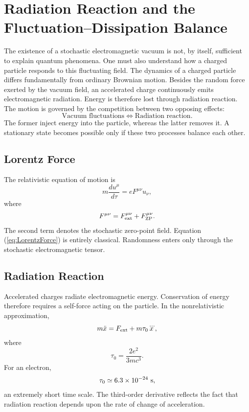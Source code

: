 \section{Radiation Reaction and the Fluctuation--Dissipation Balance}
\label{sec:RadiationReaction}
The existence of a stochastic electromagnetic vacuum is not, by itself,
sufficient to explain quantum phenomena. One must also understand how a
charged particle responds to this fluctuating field.
The dynamics of a charged particle differs fundamentally from ordinary
Brownian motion. Besides the random force exerted by the vacuum field,
an accelerated charge continuously emits electromagnetic radiation.
Energy is therefore lost through radiation reaction.
The motion is governed by the competition between two opposing effects:
\[\boxed{\text{Vacuum fluctuations}\Longleftrightarrow\text{Radiation reaction}.}\]
The former inject energy into the particle, whereas the latter removes
it. A stationary state becomes possible only if these two processes
balance each other.
\subsection{Lorentz Force}
The relativistic equation of motion is
\begin{equation}
m\frac{du^\mu}{d\tau}=eF^{\mu\nu}u_\nu ,
\label{eq:LorentzForce}
\end{equation}
where
\[F^{\mu\nu}=F^{\mu\nu}_{\rm ext}+F^{\mu\nu}_{\rm ZP}.\]
The second term denotes the stochastic zero-point field.
Equation (\ref{eq:LorentzForce}) is entirely classical.
Randomness enters only through the stochastic electromagnetic tensor.
\subsection{Radiation Reaction}
Accelerated charges radiate electromagnetic energy.
Conservation of energy therefore requires a self-force acting on the
particle.
In the nonrelativistic approximation,
\begin{equation}
m\ddot x=F_{\rm ext}+m\tau_0\dddot x ,
\label{eq:AbrahamLorentz}
\end{equation}
where
\begin{equation}
\tau_0=\frac{2e^2}{3mc^3}.
\end{equation}
For an electron,
\[\tau_0\simeq 6.3\times10^{-24}\ {\rm s},\]
an extremely short time scale.
The third-order derivative reflects the fact that radiation reaction
depends upon the rate of change of acceleration.
